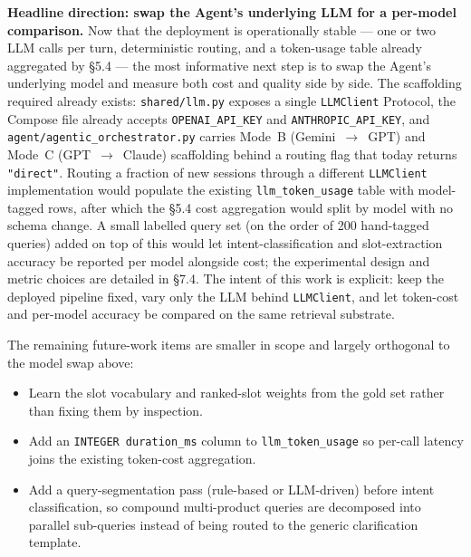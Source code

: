 \textbf{Headline direction: swap the Agent's underlying LLM for a per-model comparison.} Now that the deployment is operationally stable --- one or two LLM calls per turn, deterministic routing, and a token-usage table already aggregated by §5.4 --- the most informative next step is to swap the Agent's underlying model and measure both cost and quality side by side. The scaffolding required already exists: \texttt{shared/llm.py} exposes a single \texttt{LLMClient} Protocol, the Compose file already accepts \texttt{OPENAI\_API\_KEY} and \texttt{ANTHROPIC\_API\_KEY}, and \texttt{agent/agentic\_orchestrator.py} carries Mode~B (Gemini~$\rightarrow$~GPT) and Mode~C (GPT~$\rightarrow$~Claude) scaffolding behind a routing flag that today returns \texttt{"direct"}. Routing a fraction of new sessions through a different \texttt{LLMClient} implementation would populate the existing \texttt{llm\_token\_usage} table with model-tagged rows, after which the §5.4 cost aggregation would split by model with no schema change. A small labelled query set (on the order of 200 hand-tagged queries) added on top of this would let intent-classification and slot-extraction accuracy be reported per model alongside cost; the experimental design and metric choices are detailed in §7.4. The intent of this work is explicit: keep the deployed pipeline fixed, vary only the LLM behind \texttt{LLMClient}, and let token-cost and per-model accuracy be compared on the same retrieval substrate.

The remaining future-work items are smaller in scope and largely orthogonal to the model swap above:

\begin{itemize}
    \item Learn the slot vocabulary and ranked-slot weights from the gold set rather than fixing them by inspection.
    \item Add an \texttt{INTEGER duration\_ms} column to \texttt{llm\_token\_usage} so per-call latency joins the existing token-cost aggregation.
    \item Add a query-segmentation pass (rule-based or LLM-driven) before intent classification, so compound multi-product queries are decomposed into parallel sub-queries instead of being routed to the generic clarification template.
\end{itemize}

